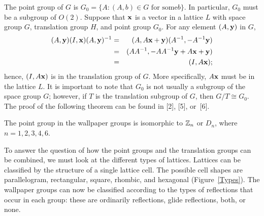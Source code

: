  
The point group of $G$ is $G_0 = \{A : (A,b) \in G \mbox{ for some
$b$}  \}$. In particular, $G_0$ must be a subgroup of $O(2)$. Suppose
that ${\bold x}$ is a vector in a lattice $L$ with space group $G$,
translation group $H$, and point group $G_0$. For any element $(A,
{\bold y})$ in $G$,   
\begin{eqnarray*}
(A, {\bold y}) (I, {\bold x}) (A, {\bold y})^{-1}
& = &
(A,A {\bold x} + {\bold y}) (A^{-1},-A^{-1} {\bold y}) \\
& = &
(A A^{-1},-A A^{-1} {\bold y} + A {\bold x} + {\bold y}) \\
& = &
(I, A {\bold x});
\end{eqnarray*}
hence, $(I, A {\bold x})$ is in the translation group of $G$. More
specifically, $A {\bold x}$ must be in the lattice $L$. It is
important to note that $G_0$ is not usually a subgroup of the space
group $G$; however, if $T$ is the translation subgroup of $G$, then
$G/T \cong G_0$. The proof of the following theorem can be found in
[2], [5], or~[6].
 
 
 
\begin{theorem}
The point group in the wallpaper groups is isomorphic to ${\Bbb Z}_n$
or $D_n$, where $n = 1, 2, 3, 4, 6$. 
\end{theorem}
 
 
To answer the question of how the point groups and the translation
groups can be combined, we must look at the different types of
lattices. Lattices can be classified by the structure of a single
lattice cell. The possible cell shapes are parallelogram, rectangular,
square, rhombic, and hexagonal (Figure~\ref{Types}). The wallpaper
groups can now be classified according to the types of reflections
that occur in each group: these are ordinarily reflections, glide
reflections, both, or none.
 
 
 
